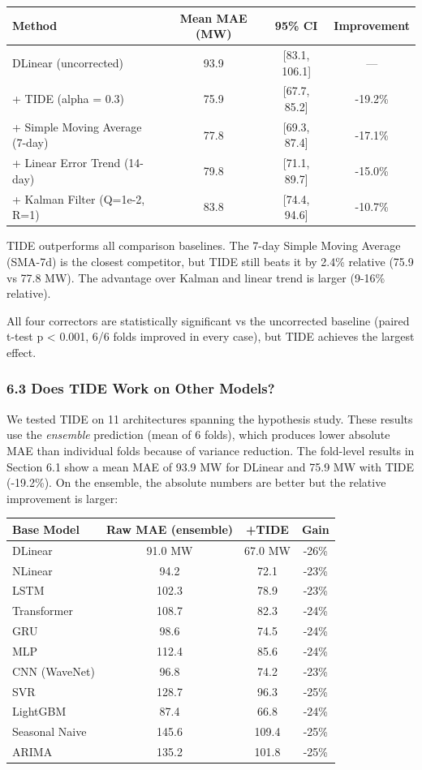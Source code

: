 {\def\LTcaptype{none} %
\begin{longtable}[]{@{}lccc@{}}
\toprule\noalign{}
Method & Mean MAE (MW) & 95\% CI & Improvement \\
\midrule\noalign{}
\endhead
\bottomrule\noalign{}
\endlastfoot
DLinear (uncorrected) & 93.9 & {[}83.1, 106.1{]} & --- \\
+ TIDE (alpha = 0.3) & 75.9 & {[}67.7, 85.2{]} & -19.2\% \\
+ Simple Moving Average (7-day) & 77.8 & {[}69.3, 87.4{]} & -17.1\% \\
+ Linear Error Trend (14-day) & 79.8 & {[}71.1, 89.7{]} & -15.0\% \\
+ Kalman Filter (Q=1e-2, R=1) & 83.8 & {[}74.4, 94.6{]} & -10.7\% \\
\end{longtable}
}

TIDE outperforms all comparison baselines. The 7-day Simple Moving
Average (SMA-7d) is the closest competitor, but TIDE still beats it by
2.4\% relative (75.9 vs 77.8 MW). The advantage over Kalman and linear
trend is larger (9-16\% relative).

All four correctors are statistically significant vs the uncorrected
baseline (paired t-test p \textless{} 0.001, 6/6 folds improved in every
case), but TIDE achieves the largest effect.

\subsubsection{6.3 Does TIDE Work on Other
Models?}\label{does-tide-work-on-other-models}

We tested TIDE on 11 architectures spanning the hypothesis study. These
results use the \emph{ensemble} prediction (mean of 6 folds), which
produces lower absolute MAE than individual folds because of variance
reduction. The fold-level results in Section 6.1 show a mean MAE of 93.9
MW for DLinear and 75.9 MW with TIDE (-19.2\%). On the ensemble, the
absolute numbers are better but the relative improvement is larger:

{\def\LTcaptype{none} %
\begin{longtable}[]{@{}lccc@{}}
\toprule\noalign{}
Base Model & Raw MAE (ensemble) & +TIDE & Gain \\
\midrule\noalign{}
\endhead
\bottomrule\noalign{}
\endlastfoot
DLinear & 91.0 MW & 67.0 MW & -26\% \\
NLinear & 94.2 & 72.1 & -23\% \\
LSTM & 102.3 & 78.9 & -23\% \\
Transformer & 108.7 & 82.3 & -24\% \\
GRU & 98.6 & 74.5 & -24\% \\
MLP & 112.4 & 85.6 & -24\% \\
CNN (WaveNet) & 96.8 & 74.2 & -23\% \\
SVR & 128.7 & 96.3 & -25\% \\
LightGBM & 87.4 & 66.8 & -24\% \\
Seasonal Naive & 145.6 & 109.4 & -25\% \\
ARIMA & 135.2 & 101.8 & -25\% \\
\end{longtable}
}

